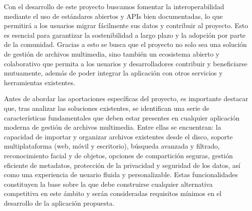 Con el desarrollo de este proyecto buscamos fomentar la interoperabilidad mediante el uso de estándares abiertos y APIs bien documentadas, lo que permitirá a los usuarios migrar fácilmente sus datos y contribuir al proyecto. Esto es esencial para garantizar la sostenibilidad a largo plazo y la adopción por parte de la comunidad.
Gracias a esto se busca que el proyecto no solo sea una solución de gestión de archivos multimedia, sino también un ecosistema abierto y colaborativo que permita a los usuarios y desarrolladores contribuir y beneficiarse mutuamente, además de poder integrar la aplicación con otros servicios y herramientas existentes.

Antes de abordar las aportaciones específicas del proyecto, es importante destacar que, tras analizar las soluciones existentes, se identifican una serie de características fundamentales que deben estar presentes en cualquier aplicación moderna de gestión de archivos multimedia. Entre ellas se encuentran: la capacidad de importar y organizar archivos existentes desde el disco, soporte multiplataforma (web, móvil y escritorio), búsqueda avanzada y filtrado, reconocimiento facial y de objetos, opciones de compartición seguras, gestión eficiente de metadatos, protección de la privacidad y seguridad de los datos, así como una experiencia de usuario fluida y personalizable. Estas funcionalidades constituyen la base sobre la que debe construirse cualquier alternativa competitiva en este ámbito y serán consideradas requisitos mínimos en el desarrollo de la aplicación propuesta.

